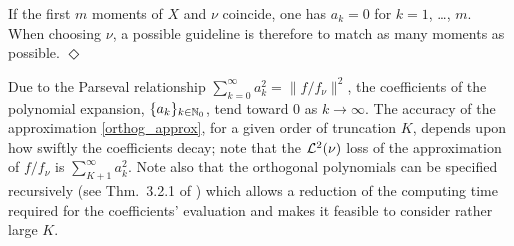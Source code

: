 \begin{remark}\label{Rem:27.10a}
If the first $m$ moments of $X$ and $\nu$ coincide, one has $a_k=0$ for $k=1$, \ldots, $m$.
When choosing $\nu$, a possible guideline is therefore to match as many moments as possible.
\hfill $\Diamond$
\end{remark}

Due to the Parseval relationship $\sum_{k=0}^\infty a_k^2=\|f/f_\nu\|^2$, the coefficients of the polynomial expansion, $\{a_k\}_{k\in\mathbb{N}_0}$, tend toward $0$ as $k \to \infty$.
The accuracy of the approximation \eqref{orthog_approx}, for a given order of truncation $K$, depends upon how swiftly the coefficients decay; note that the $\mathcal{L}^{2}(\nu)$ loss of the approximation of $f/f_\nu$ is $\sum_{K+1}^{\infty}a_k^2$.
Note also that the orthogonal polynomials can be specified recursively
(see Thm.~3.2.1 of \cite{Sz39}) which allows a reduction of the computing time required for the coefficients' evaluation
and makes it feasible to consider rather large $K$.


